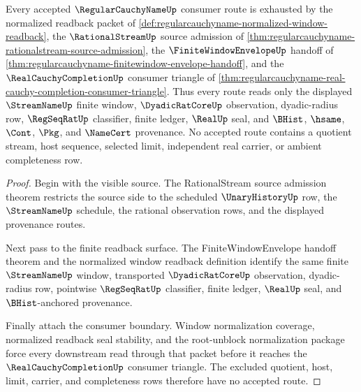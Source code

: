 \begin{theorem}
\label{thm:regularcauchyname-route-exhaustion}
Every accepted $\RegularCauchyNameUp$ consumer route is exhausted by the normalized readback packet of \autoref{def:regularcauchyname-normalized-window-readback}, the $\RationalStreamUp$ source admission of \autoref{thm:regularcauchyname-rationalstream-source-admission}, the $\FiniteWindowEnvelopeUp$ handoff of \autoref{thm:regularcauchyname-finitewindow-envelope-handoff}, and the $\RealCauchyCompletionUp$ consumer triangle of \autoref{thm:regularcauchyname-real-cauchy-completion-consumer-triangle}. Thus every route reads only the displayed $\StreamNameUp$ finite window, $\DyadicRatCoreUp$ observation, dyadic-radius row, $\RegSeqRatUp$ classifier, finite ledger, $\RealUp$ seal, and $\BHist$, $\hsame$, $\Cont$, $\Pkg$, and $\NameCert$ provenance. No accepted route contains a quotient stream, host sequence, selected limit, independent real carrier, or ambient completeness row.
\end{theorem}
\begin{proof}
Begin with the visible source. The RationalStream source admission theorem restricts the source side to the scheduled $\UnaryHistoryUp$ row, the $\StreamNameUp$ schedule, the rational observation rows, and the displayed provenance routes.

Next pass to the finite readback surface. The FiniteWindowEnvelope handoff theorem and the normalized window readback definition identify the same finite $\StreamNameUp$ window, transported $\DyadicRatCoreUp$ observation, dyadic-radius row, pointwise $\RegSeqRatUp$ classifier, finite ledger, $\RealUp$ seal, and $\BHist$-anchored provenance.

Finally attach the consumer boundary. Window normalization coverage, normalized readback seal stability, and the root-unblock normalization package force every downstream read through that packet before it reaches the $\RealCauchyCompletionUp$ consumer triangle. The excluded quotient, host, limit, carrier, and completeness rows therefore have no accepted route.
\end{proof}

